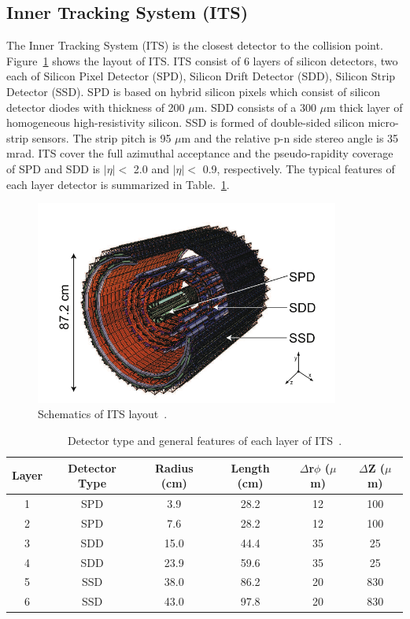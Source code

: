 \subsection{Inner Tracking System (ITS)}
The Inner Tracking System (ITS) is the closest detector to the collision point. 
Figure~\ref{fig_3_itslayout} shows the layout of ITS. 
ITS consist of 6 layers of silicon detectors, two each of Silicon Pixel Detector (SPD), Silicon Drift Detector (SDD), Silicon Strip Detector (SSD). 
SPD is based on hybrid silicon pixels which consist of silicon detector diodes with thickness of 200 $\mu$m. 
SDD consists of a 300 $\mu$m  thick layer of homogeneous high-resistivity silicon. 
SSD is formed of double-sided silicon micro-strip sensors. 
The strip pitch is 95 $\mu$m  and the relative p-n side stereo angle is 35 mrad. 
ITS cover the full azimuthal acceptance and the pseudo-rapidity coverage of SPD and SDD is $|\eta|<$ 2.0 and $|\eta|<$ 0.9, respectively.  
The typical features of each layer detector is summarized in Table.~\ref{table_3_itsdet}. 
\begin{figure}[!h]
  \centering
  \includegraphics[width=10cm]{chap3/figure/ITS/Schematics_ITS.png}
  \caption{Schematics of ITS layout~\cite{bib_itstdr}.}
  \label{fig_3_itslayout}
\end{figure}

\begin{table}[!htb]
  \centering
  \begin{tabular}{|c|c|c|c|c|c|} \hline
    Layer & Detector Type  & Radius (cm) & Length (cm) & $\Delta$r$\phi$ ($\mu$m) & $\Delta$Z ($\mu$m) \\ \hline
    1     & SPD            & 3.9         & 28.2 & 12 & 100 \\ \hline 
    2     & SPD            & 7.6         & 28.2 & 12 & 100 \\ \hline
    3     & SDD            & 15.0        & 44.4 & 35 & 25 \\ \hline
    4     & SDD            & 23.9        & 59.6 & 35 & 25 \\ \hline
    5     & SSD            & 38.0        & 86.2 & 20 & 830 \\ \hline
    6     & SSD            & 43.0        & 97.8 & 20 & 830 \\ \hline
  \end{tabular}
  \caption{ Detector type and general features of each layer of ITS~\cite{bib_itstdr}.}
  \label{table_3_itsdet}
\end{table}

